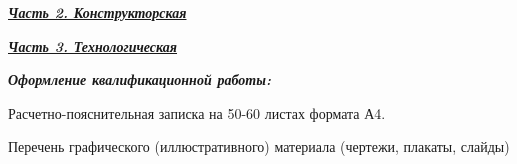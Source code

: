 \documentclass[14pt, left=25mm, right=15mm, top=20mm, bottom=10mm]{templateTaskBMSTU}
\begin{document}
	\begin{flushleft}
		\fontsize{12pt}{\baselineskip}\selectfont

		\textbf{\uline{\textit{Часть 2. Конструкторская}}}
		
		\uline{\hfill}
		
		\uline{\hfill}
		
		\uline{\hfill}

		\uline{\hfill}

		\uline{\hfill}

		\uline{\hfill}

		\uline{\hfill}

		\uline{\hfill}

		\uline{\hfill}

		\uline{\hfill}
	\end{flushleft}

	\begin{flushleft}
		\fontsize{12pt}{\baselineskip}\selectfont

		\textbf{\uline{\textit{Часть 3. Технологическая}}}
		
		\uline{\hfill}

		\uline{\hfill}

		\uline{\hfill}

		\uline{\hfill}

		\uline{\hfill}

		\uline{\hfill}
	\end{flushleft}

	\vfill

	\begin{flushleft}
		\fontsize{12pt}{\baselineskip}\selectfont

		\textbf{\textit{Оформление квалификационной работы:}}
		
		Расчетно-пояснительная записка на 50-60 листах формата А4.

		Перечень графического (иллюстративного) материала (чертежи, плакаты, слайды)
		
		\uline{\hfill}
		
		\uline{\hfill}
		
		\uline{\hfill}
		
		\uline{\hfill}
		
		\uline{\hfill}
		
		\uline{\hfill}

		\uline{\hfill}

		\uline{\hfill}

		\uline{\hfill}
	\end{flushleft}
\end{document}
